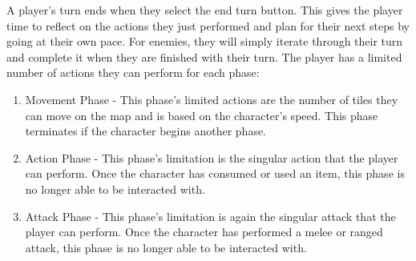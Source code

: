 \documentclass[12pt, titlepage]{article}
\begin{document}
\begin{enumerate}
	A player's turn ends when they select the end turn button. This gives the player time to reflect on the actions they just performed and plan for their next steps by going at their own pace. For enemies, they will simply iterate through their turn and complete it when they are finished with their turn.
	The player has a limited number of actions they can perform for each phase: 
	\begin{enumerate}
	\item Movement Phase - This phase's limited actions are the number of tiles they can move on the map and is based on the character's speed. This phase terminates if the character begins another phase.
	\item Action Phase - This phase's limitation is the singular action that the player can perform. Once the character has consumed or used an item, this phase is no longer able to be interacted with.
	\item Attack Phase - This phase's limitation is again the singular attack that the player can perform. Once the character has performed a melee or ranged attack, this phase is no longer able to be interacted with.
	\end{enumerate}
	

\end{enumerate}
\end{document}
